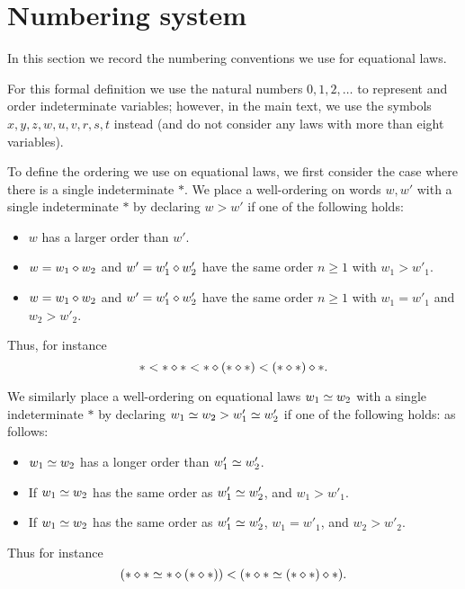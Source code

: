 \section{Numbering system}\label{numbering-app}

In this section we record the numbering conventions we use for equational laws.

For this formal definition we use the natural numbers $0,1,2,\dots$ to represent and order indeterminate variables; however, in the main text, we use the symbols $x,y,z,w,u,v,r,s,t$ instead (and do not consider any laws with more than eight variables).

To define the ordering we use on equational laws, we first consider the case where there is a single indeterminate $\ast$.
We place a well-ordering on words $w,w'$ with a single indeterminate $\ast$ by declaring $w > w'$ if one of the following holds:
\begin{itemize}
    \item $w$ has a larger order than $w'$.
    \item $w = w_1 \diamond w_2$ and $w' = w'_1 \diamond w'_2$ have the same order $n \geq 1$ with $w_1 > w'_1$.
    \item $w = w_1 \diamond w_2$ and $w' = w'_1 \diamond w'_2$ have the same order $n \geq 1$ with $w_1 = w'_1$ and $w_2 > w'_2$.
\end{itemize}
Thus, for instance
$$ \ast < \ast \diamond \ast < \ast \diamond (\ast \diamond \ast) < (\ast \diamond \ast) \diamond \ast.$$

We similarly place a well-ordering on equational laws $w_1 \simeq w_2$ with a single indeterminate $\ast$ by declaring $w_1 \simeq w_2 > w'_1 \simeq w'_2$ if one of the following holds:
as follows:
\begin{itemize}
\item  $w_1 \simeq w_2$ has a longer order than $w'_1 \simeq w'_2$.
\item If $w_1 \simeq w_2$ has the same order as $w'_1 \simeq w'_2$, and $w_1 > w'_1$.
\item If $w_1 \simeq w_2$ has the same order as $w'_1 \simeq w'_2$, $w_1 = w'_1$, and $w_2 > w'_2$.
\end{itemize}
Thus for instance
$$ (\ast \diamond \ast \simeq \ast \diamond (\ast \diamond \ast)) < (\ast \diamond \ast \simeq (\ast \diamond \ast) \diamond \ast).$$

